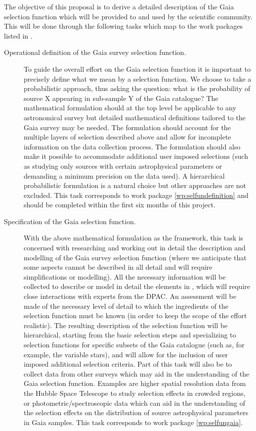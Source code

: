 The objective of this proposal is to derive a detailed description of the Gaia selection function which will be provided to and used by the scientific community. This will be done through the following tasks which map to the work packages listed in .

\begin{description}
    \item[Operational definition of the Gaia survey selection function.] To guide the overall effort on the Gaia selection function it is important to precisely define what we mean by a selection function. We choose to take a probabilistic approach, thus asking the question: what is the probability of source X appearing in sub-sample Y of the Gaia catalogue? The mathematical formulation should at the top level be applicable to any astronomical survey but detailed mathematical definitions tailored to the Gaia survey may be needed. The formulation should account for the multiple layers of selection described above and allow for incomplete information on the data collection process. The formulation should also make it possible to accommodate additional user imposed selections (such as studying only sources with certain astrophysical parameters or demanding a minimum precision on the data used). A hierarchical probabilistic formulation is a natural choice but other approaches are not excluded. This task corresponds to work package \ref{wp:selfundefinition} and should be completed within the first six months of this project.
    \item[Specification of the Gaia selection function.] With the above mathematical formulation as the framework, this task is concerned with researching and working out in detail the description and modelling of the Gaia survey selection function (where we anticipate that some aspects cannot be described in all detail and will require simplifications or modelling). All the necessary information will be collected to describe or model in detail the elements in , which will require close interactions with experts from the DPAC. An assessment will be made of the necessary level of detail to which the ingredients of the selection function must be known (in order to keep the scope of the effort realistic). The resulting description of the selection function will be hierarchical, starting from the basic selection steps and specializing to selection functions for specific subsets of the Gaia catalogue (such as, for example, the variable stars), and will allow for the inclusion of user imposed additional selection criteria. Part of this task will also be to collect data from other surveys which may aid in the understanding of the Gaia selection function. Examples are higher spatial resolution data from the Hubble Space Telescope to study selection effects in crowded regions, or photometric/spectroscopic data which can aid in the understanding of the selection effects on the distribution of source astrophysical parameters in Gaia samples. This task corresponds to work package \ref{wp:selfungaia}.

\end{description}
